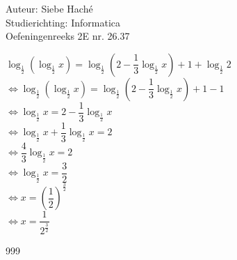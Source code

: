 \documentclass[a4paper]{article}
\begin{document}
\noindent \large Auteur: Siebe Haché \\
\noindent \large Studierichting: Informatica\\
\noindent \large Oefeningenreeks 2E nr. 26.37\\

\medskip
\normalsize

$\log_{\tfrac{1}{2}}\left(\log_{\tfrac{1}{2}} x\right) = \log_{\tfrac{1}{2}}\left(2 - \dfrac{1}{3}\log_{\tfrac{1}{2}} x\right) + 1 + \log_{\tfrac{1}{2}} 2 $\\

$\Leftrightarrow \log_{\tfrac{1}{2}}\left(\log_{\tfrac{1}{2}} x\right) = \log_{\tfrac{1}{2}}\left(2 - \dfrac{1}{3}\log_{\tfrac{1}{2}} x\right) + 1 - 1$ \\

$\Leftrightarrow \log_{\tfrac{1}{2}} x = 2 - \dfrac{1}{3}\log_{\tfrac{1}{2}} x $\\

$\Leftrightarrow \log_{\tfrac{1}{2}} x + \dfrac{1}{3}\log_{\tfrac{1}{2}} x = 2 $ \\

$ \Leftrightarrow \dfrac{4}{3}\log_{\tfrac{1}{2}} x = 2$ \\

$\Leftrightarrow \log_{\tfrac{1}{2}} x = \dfrac{3}{2}$\\

$\Leftrightarrow x = \left(\dfrac{1}{2}\right)^{\tfrac{3}{2}}$ \\

$\Leftrightarrow x = \dfrac{1}{2^{\tfrac{3}{2}}} $ \\


\begin{thebibliography}{999}
\end{thebibliography}
\end{document}
